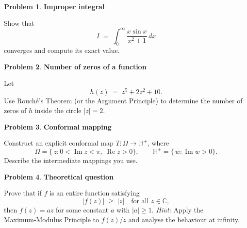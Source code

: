 \documentclass[12pt]{article}
\theoremstyle{definition} %
\newtheorem{problem}{Problem}
\theoremstyle{plain} %
\begin{document}
  \pagebreak
  
  \begin{problem}
  \textbf{Improper integral}  
  
  Show that
  \[
    I \;=\;\int_{0}^{\infty}\frac{x\sin x}{x^{2}+1}\,dx
  \]
  converges and compute its exact value.
  \end{problem}
  
  \pagebreak
  
  \begin{problem}
  \textbf{Number of zeros of a function}  
  
  Let  
  \[
    h(z)\;=\;z^{5}+2z^{2}+10.
  \]
  Use Rouché’s Theorem (or the Argument Principle) to determine the number of zeros of \(h\) inside the circle \(\lvert z\rvert = 2\).
  \end{problem}
  
  \pagebreak
  
  \begin{problem}
  \textbf{Conformal mapping}  
  
  Construct an explicit conformal map \(T:\Omega\to\mathbb{H}^{+}\), where  
  \[
    \Omega=\bigl\{\,z : 0<\operatorname{Im}z<\pi,\; \operatorname{Re}z>0\bigr\},
    \qquad
    \mathbb{H}^{+}=\bigl\{\,w : \operatorname{Im}w>0\bigr\}.
  \]
  Describe the intermediate mappings you use.
  \end{problem}
  
  \pagebreak
  
  \begin{problem}
  \textbf{Theoretical question}  
  
  Prove that if \(f\) is an entire function satisfying
  \[
    \bigl|f(z)\bigr|\;\ge\;\bigl|z\bigr|
    \quad\text{for all }z\in\mathbb{C},
  \]
  then \(f(z)=az\) for some constant \(a\) with \(\lvert a\rvert\ge 1\).  
  \emph{Hint:} Apply the Maximum‑Modulus Principle to \(f(z)/z\) and analyse the behaviour at infinity.
  \end{problem}
\end{document}
